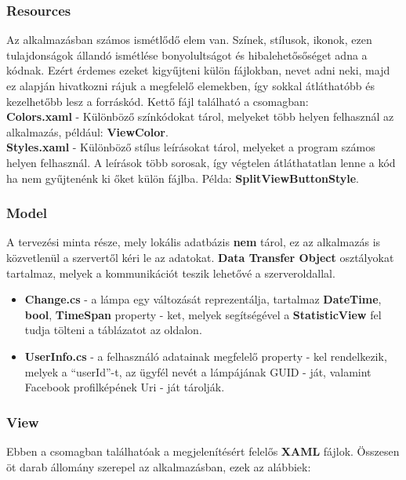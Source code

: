 \documentclass[a4paper,12pt]{report}
\begin{document}
\subsubsection{Resources}
    Az alkalmazásban számos ismétlődő elem van. Színek, stílusok, ikonok, ezen tulajdonságok állandó ismétlése bonyolultságot
    és hibalehetősőséget adna a kódnak. Ezért érdemes ezeket kigyűjteni külön fájlokban, nevet adni neki, majd ez alapján hivatkozni
    rájuk a megfelelő elemekben, így sokkal átláthatóbb és kezelhetőbb lesz a forráskód. Kettő fájl található a csomagban:\\

    \textbf{Colors.xaml} - Különböző színkódokat tárol, melyeket több helyen felhasznál az alkalmazás, például: \textbf{ViewColor}.\\

    \textbf{Styles.xaml} - Különböző stílus leírásokat tárol, melyeket a program számos helyen felhasznál. A leírások több sorosak,
    így végtelen átláthatatlan lenne a kód ha nem gyűjtenénk ki őket külön fájlba. Példa: \textbf{SplitViewButtonStyle}.

\subsubsection{Model}
    A tervezési minta része, mely lokális adatbázis \textbf{nem} tárol, ez az alkalmazás is közvetlenül a szervertől kéri le az
    adatokat. \textbf{Data Transfer Object} osztályokat tartalmaz, melyek a kommunikációt teszik lehetővé a szerveroldallal.

\begin{itemize}
    \item \textbf{Change.cs} - a lámpa egy változását reprezentálja, tartalmaz \textbf{DateTime}, \textbf{bool}, \textbf{TimeSpan} property - ket,
    melyek segítségével a \textbf{StatisticView} fel tudja tölteni a táblázatot az oldalon.
    \item \textbf{UserInfo.cs} - a felhasználó adatainak megfelelő property - kel rendelkezik, melyek a ``userId''-t, az ügyfél nevét
    a lámpájának GUID -  ját, valamint Facebook profilképének Uri - ját tárolják.
\end{itemize}

\subsubsection{View}
    Ebben a csomagban találhatóak a megjelenítésért felelős \textbf{XAML} fájlok. Összesen öt darab állomány szerepel az alkalmazásban,
    ezek az alábbiek:
\end{document}

